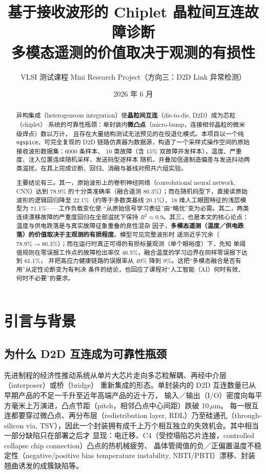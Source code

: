 \documentclass[11pt,a4paper,fontset=mac]{ctexart}
\title{\bfseries 基于接收波形的 Chiplet 晶粒间互连故障诊断\\
\large 多模态遥测的价值取决于观测的有损性}
\author{VLSI 测试课程  Mini Research Project（方向三：D2D Link 异常检测）}
\date{2026 年 6 月}
\newcommand{\term}[1]{\textbf{#1}}
\begin{document}
\maketitle

\begin{abstract}
\noindent
异构集成（heterogeneous integration）使\term{晶粒间互连}（die-to-die, D2D）成为芯粒（chiplet）
系统的可靠性瓶颈：单封装内\term{微凸点}（micro-bump，连接相邻晶粒的微米级焊点）数以万计，
且存在大量结构测试无法预见的在役退化模式。本项目以一个纯 \texttt{ngspice}、可完全复现的
D2D 链路仿真器为数据源，构造了一个采样式操作空间的原始接收波形数据集：6000 条样本、
10 类故障（含 $15\%$ 双故障并发样本），温度、严重度、注入位置连续随机采样，发送码型逐样本
随机，并叠加信道制造偏差与发送抖动两类滋扰，在其上完成诊断、回归、消融与基线对照共六组实验。

主要结论有三。其一，原始波形上的卷积神经网络（convolutional neural network, CNN）达到
78.9\% 的十分类准确率（融合遥测 80.3\%）；而在随机码型下，直接读原始波形的逻辑回归降至
22.1\%（约等于多数类基线 20.1\%）、18 维人工眼图特征的浅层模型为 71.1\%——工作负载变化使
“从原始信号学习表征”由“略优”变为必需。其二，两类连续漂移故障的严重度回归在全部滋扰下保持
$R^2\approx0.9$。其三，也是本文的核心论点：温度与供电跌落是与真实故障征象重叠的良性混杂
因子，\textbf{多模态遥测（温度／供电跌落）的价值取决于主观测的有损程度}。模型可见完整波形时
遥测近乎冗余（$78.9\%\to80.3\%$）；而在运行时真正可得的有损标量观测（单个眼裕度）下，先知
单阈值规则在零误报工作点的故障检出率仅 46.5\%，融合温度的学习边界在同样零误报下达到 61.1\%，
并把高应力健康链路的误报率从 49\% 降到 9\%。这把“多模态融合是否有用”从定性论断变为有判决
条件的结论，也回应了课程对“人工智能（AI）何时有效、何时不必要”的要求。
\end{abstract}

\section{引言与背景}

\subsection{为什么 D2D 互连成为可靠性瓶颈}
先进制程的经济性推动系统从单片大芯片走向多芯粒解耦、再经中介层（interposer）或桥（bridge）
重新集成的形态。单封装内的 D2D 互连数量已从早期产品的不足一千升至近年高端产品的近十万，
输入／输出（I/O）密度向每平方毫米上万演进，凸点节距（pitch，相邻凸点中心间距）跌破 10\,$\mu$m。
每一根互连都要穿过微凸点、再分布层（redistribution layer, RDL）乃至硅通孔（through-silicon
via, TSV），因此一个封装拥有成千上万个相互独立的失效机会。其中相当一部分缺陷只在部署之后才
显现：电迁移、C4（受控塌陷芯片连接，controlled collapse chip connection）凸点的热机械疲劳、
晶体管阈值的负／正偏置温度不稳定性（negative/positive bias temperature instability,
NBTI/PBTI）漂移、封装翘曲诱发的成簇缺陷等。
\end{document}
